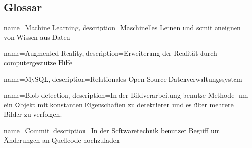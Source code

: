 \subsection{Glossar}

{
  name=Machine Learning,
  description={Maschinelles Lernen und somit aneignen von Wissen aus Daten}
}

{
  name=Augmented Reality,
  description={Erweiterung der Realität durch computergestütze Hilfe}
}

{
  name=MySQL,
  description={Relationales Open Source Datenverwaltungssystem}
}

{
  name=Blob detection,
  description={In der Bildverarbeitung benutze Methode, um ein Objekt mit konstanten Eigenschaften zu detektieren und es über mehrere Bilder zu verfolgen.}
}

{
  name=Commit,
  description={In der Softwaretechnik benutzer Begriff um Änderungen an Quellcode             
               hochzuladen }
}


\glsaddall

\printglossary[style=super, nonumberlist]